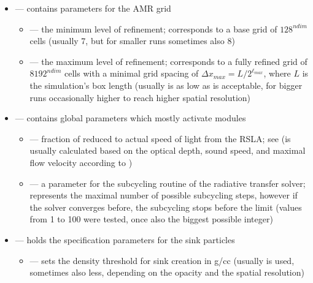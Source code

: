 \begin{itemize}
  \item {} \quad--- contains parameters for the AMR grid \\[-9pt]
  \begin{itemize}
    \item {} --- the minimum level of refinement; corresponds to a base grid of $128^{ndim}$ cells (usually 7, but for smaller runs sometimes also 8) \\[-9pt]
    \item {} --- the maximum level of refinement; corresponds to a fully refined grid of $8192^{ndim}$ cells with a minimal grid spacing of $\Delta x_{max} = L/2^{\ell_{max}}$, where $L$ is the simulation's box length (usually  is as low as is acceptable, for bigger runs occasionally higher to reach higher spatial resolution) \\[-3pt]
  \end{itemize}
  \item {} \quad--- contains global parameters which mostly activate modules\\[-9pt]
  \begin{itemize}
    \item {} --- fraction of reduced to actual speed of light from the RSLA; see  (is usually calculated based on the optical depth, sound speed, and maximal flow velocity according to \citet{Skinner_Ostriker})\\[-9pt]
    \item {} --- a parameter for the subcycling routine of the radiative transfer solver; represents the maximal number of possible subcycling steps, however if the solver converges before, the subcycling stops before the limit (values from 1 to 100 were tested, once also the biggest possible integer)\\[-3pt]
  \end{itemize}
  \item {} \quad--- holds the specification parameters for the sink particles\\[-9pt]
  \begin{itemize}
    \item {} --- sets the density threshold for sink creation in g/cc (usually  is used, sometimes also less, depending on the opacity and the spatial resolution)\\[-9pt]

\end{itemize}
\end{itemize}
